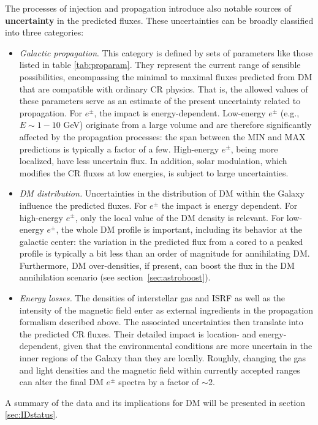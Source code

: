 The processes of injection and propagation introduce also notable sources of {\bf uncertainty} in the predicted fluxes. 
These uncertainties can be broadly classified into three categories:
\begin{itemize}
\item[$\triangleright$] \textit{Galactic propagation}. 
This category is defined by sets of parameters like those listed in table \ref{tab:proparam}. 
They represent the current range of sensible possibilities, encompassing the minimal to maximal fluxes predicted from DM  that are compatible with ordinary CR physics.
That is, the allowed values of these parameters serve as an estimate of the present uncertainty related to propagation.
 For $e^\pm$, the impact is energy-dependent. 
 Low-energy $e^\pm$ (e.g.,~$E\sim1-10$ GeV) 
 originate from a large volume
  and are therefore significantly affected by the propagation processes: the span between the MIN and MAX predictions is typically a factor of a few. 
  High-energy $e^\pm$, being more localized, have less uncertain flux. 
In addition, solar modulation, which modifies the CR fluxes at low energies, is subject to large uncertainties.
\item[$\triangleright$] \textit{DM distribution.} 
Uncertainties in the distribution of DM within the Galaxy influence the predicted fluxes.  For $e^\pm$ the impact is energy dependent. For high-energy $e^\pm$, only the local value of the DM density is relevant. For low-energy $e^\pm$, the whole  DM profile is important, including its behavior at the galactic center: the variation in the predicted flux from a cored  to a peaked profile is typically a bit less than an order of magnitude for annihilating DM.
Furthermore, DM over-densities, if present, can boost the flux in the DM annihilation scenario (see section~\ref{sec:astroboost}).
\item[$\triangleright$] \textit{Energy losses.} The densities of interstellar gas and  ISRF as well as  the intensity of the magnetic field enter as external ingredients in the propagation formalism described above. 
The associated uncertainties then translate into 
the predicted CR fluxes. Their detailed impact is location- and energy-dependent, given that the environmental conditions are more uncertain in the inner regions of the Galaxy than they are locally. Roughly, changing the gas and light densities and the magnetic field within currently accepted ranges can alter the final DM $e^\pm$ spectra by a factor of $\sim$2.
\end{itemize}
A summary of the data and its implications for DM will be presented  in section \ref{sec:IDstatus}.



